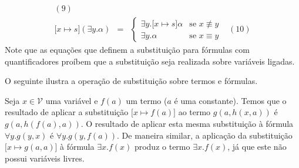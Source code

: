 \begin{Definition}[Substituição]
\[\begin{array}{lclc}
                                                                                   (9)\\
\lbrack x \mapsto s\rbrack (\exists y. \alpha) & = & \left\{
                                                                                       \begin{array}{ll}
                                                                                         \exists
                                                                                         y. \lbrack
                                                                                         x
                                                                                         \mapsto
                                                                                         s\rbrack
                                                                                         \alpha
                                                                                         &
                                                                                         \text{se
                                                                                         }x\not\equiv
                                                                                         y
                                                                                         \\
                                                                                         \exists
                                                                                         y. \alpha
                                                                                         &
                                                                                         \text{se
                                                                                         }x
                                                                                         \equiv y
                                                                                        \end{array}
                                                                                   \right. & (10)
\end{array}
\]
Note que as equações que definem a substituição para fórmulas com
quantificadores proíbem que a substituição seja realizada sobre
variáveis ligadas.
\end{Definition}
O seguinte ilustra a operação de substituição sobre termos e fórmulas.
\begin{Example}
Seja $x \in \mathcal{V}$ uma variável e $f(a)$ um termo ($a$ é uma
constante). Temos que o resultado de aplicar a substituição $\lbrack x \mapsto
f(a)\rbrack$ ao termo $g(a,h(x,a))$ é $g(a,h(f(a),a))$. O resultado de
aplicar esta mesma substituição à fórmula $\forall y. g(y,x)$ é
$\forall y. g(y,f(a))$. De maneira similar, a aplicação da
substituição $\lbrack x \mapsto g(a,a) \rbrack$ à fórmula $\exists
x. f(x)$ produz o termo $\exists x. f(x)$, já que este não possui
variáveis livres.
\end{Example}

